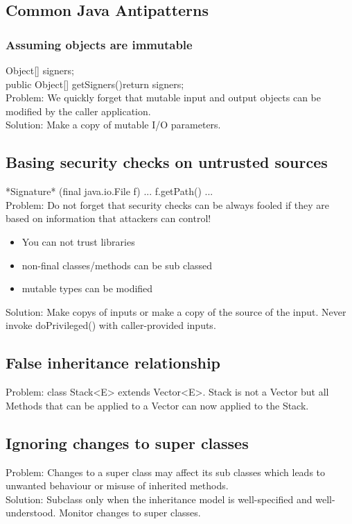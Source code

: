 \documentclass[10pt]{article}
\begin{document}
\subsection{Common Java Antipatterns}
\subsubsection{Assuming objects are immutable}
Object[] signers;\\
public Object[] getSigners(){return signers;}\\
Problem: We quickly forget that mutable input and output objects can be modified by the caller application.\\
Solution: Make a copy of mutable I/O parameters.
\subsection{Basing security checks on untrusted sources}
*Signature* (final java.io.File f) { ... f.getPath() ... }\\
Problem: Do not forget that security checks can be always fooled if they are based on information that attackers can control!
\begin{itemize}
	\item You can not trust libraries
	\item non-final classes/methods can be sub classed
	\item mutable types can be modified
\end{itemize}
Solution: Make copys of inputs or make a copy of the source of the input. Never invoke doPrivileged() with caller-provided inputs.
\subsection{False inheritance relationship}
Problem: class Stack<E> extends Vector<E>. Stack is not a Vector but all Methods that can be applied to a Vector can now applied to the Stack.
\subsection{Ignoring changes to super classes}
Problem: Changes to a super class may affect its sub classes which leads to unwanted behaviour or misuse of inherited methods.\\
Solution: Subclass only when the inheritance model is well-specified and well-understood. Monitor changes to super classes.
\end{document}
